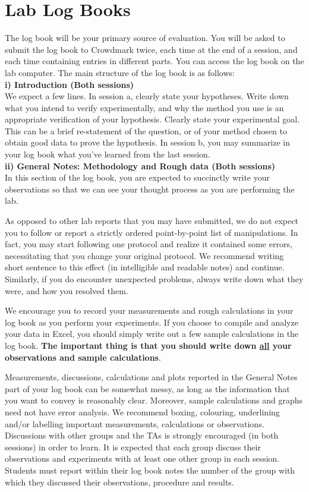 \documentclass[12pt]{report}
\begin{document}
\section{Lab Log Books}
The log book will be your primary source of evaluation. You will be asked to submit the log book to Crowdmark twice, each time at the end of a session, and each time containing entries in different parts. You can access the log book on the lab computer. The main structure of the log book is as follows:\\
 
\noindent \textbf{i) Introduction (Both sessions)} \\
\noindent We expect a few lines. In session a, clearly state your hypotheses. Write down what you intend to verify experimentally, and why the method you use is an appropriate verification of your hypothesis. Clearly state your experimental goal. This can be a brief re-statement of the question, or of your method chosen to obtain good data to prove the hypothesis.
In session b, you may summarize in your log book what you've learned from the last session. \\

\noindent \textbf{ii) General Notes: Methodology and Rough data (Both sessions)} \\
In this section of the log book, you are  expected to succinctly write  your observations so that we can see your thought process as you are performing the lab. 

As opposed to other lab reports that you may have submitted, we do not expect you to follow or report a strictly ordered point-by-point list of manipulations. In fact, you may start following one protocol and realize it contained  some errors, necessitating that you change your original protocol. We recommend writing short sentence to this effect (in intelligible and readable notes) and continue. Similarly, if you do encounter unexpected problems, always write down what they were, and how you resolved them.

We encourage you to record your measurements and rough calculations in your log book as you perform your experiments. If you choose to compile and analyze your data in Excel, you should simply write out a few sample calculations in the log book.  \textbf{ The important thing is that you should write down \underline{all} your observations and sample calculations}. 

Measurements, discussions, calculations and plots reported in  the General Notes part of your log book can be somewhat messy, as long as the information that you want to convey is reasonably clear.  Moreover, sample calculations and graphs need not have error analysis. We recommend boxing, colouring, underlining and/or labelling important measurements, calculations or observations. Discussions with other groups and the TAs is strongly encouraged (in both sessions) in order to learn. 
It is expected that each group discuss their observations and experiments with at least one other group in each session.
Students must report within their log book notes the number of the group with which they discussed their observations, procedure and results.   \\
\end{document}
